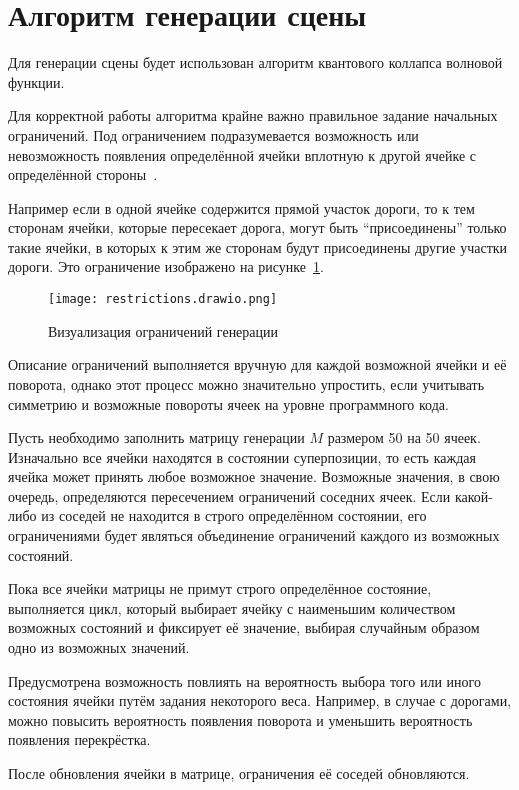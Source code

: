 \section{Алгоритм генерации сцены}

Для генерации сцены будет использован алгоритм квантового коллапса волновой функции. 

Для корректной работы алгоритма крайне важно правильное задание начальных ограничений. Под ограничением подразумевается возможность или невозможность появления определённой ячейки вплотную к другой ячейке с определённой стороны~\cite{QWFC}.

Например если в одной ячейке содержится прямой участок дороги, то к тем сторонам ячейки, которые пересекает дорога, могут быть ``присоединены'' только такие ячейки, в которых к этим же сторонам будут присоединены другие участки дороги. Это ограничение изображено на рисунке~\ref{fig:restrictions}.

\begin{figure}[h!]
    \centering
    \texttt{[image: restrictions.drawio.png]}
    \caption{Визуализация ограничений генерации}
    \label{fig:restrictions}
\end{figure}

Описание ограничений выполняется вручную для каждой возможной ячейки и её поворота, однако этот процесс можно значительно упростить, если учитывать симметрию и возможные повороты ячеек на уровне программного кода. 

Пусть необходимо заполнить матрицу генерации $M$ размером 50 на 50 ячеек. Изначально все ячейки находятся в состоянии суперпозиции, то есть каждая ячейка может принять любое возможное значение. Возможные значения, в свою очередь, определяются пересечением ограничений соседних ячеек. Если какой-либо из соседей не находится в строго определённом состоянии, его ограничениями будет являться объединение ограничений каждого из возможных состояний.

Пока все ячейки матрицы не примут строго определённое состояние, выполняется цикл, который выбирает ячейку с наименьшим количеством возможных состояний и фиксирует её значение, выбирая случайным образом одно из возможных значений.

Предусмотрена возможность повлиять на вероятность выбора того или иного состояния ячейки путём задания некоторого веса. Например, в случае с дорогами, можно повысить вероятность появления поворота и уменьшить вероятность появления перекрёстка.

После обновления ячейки в матрице, ограничения её соседей обновляются.

